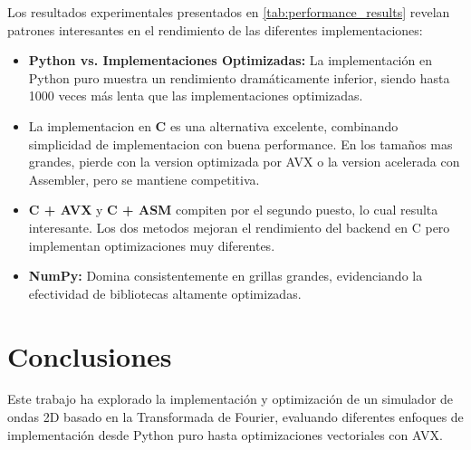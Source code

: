 \documentclass[a4paper]{article}
\begin{document}
Los resultados experimentales presentados en \ref{tab:performance_results} revelan patrones interesantes en el rendimiento de las diferentes implementaciones:
\begin{itemize}
    \item \textbf{Python vs. Implementaciones Optimizadas:} La implementación en Python puro muestra un rendimiento dramáticamente inferior, siendo hasta 1000 veces más lenta que las implementaciones optimizadas.

    \item La implementacion en \textbf{C} es una alternativa excelente, combinando simplicidad de implementacion con buena performance. En los tamaños mas grandes, pierde con
          la version optimizada por AVX o la version acelerada con Assembler, pero se mantiene competitiva.

    \item \textbf{C + AVX} y \textbf{C + ASM} compiten por el segundo puesto, lo cual resulta interesante. Los dos metodos mejoran el rendimiento del backend en C pero implementan
          optimizaciones muy diferentes.

    \item \textbf{NumPy:} Domina consistentemente en grillas grandes, evidenciando la efectividad de bibliotecas altamente optimizadas.
\end{itemize}

\section{Conclusiones}

Este trabajo ha explorado la implementación y optimización de un simulador de ondas 2D basado en la Transformada de Fourier, evaluando diferentes enfoques de implementación desde Python puro hasta optimizaciones vectoriales con AVX. 

\printbibliography
\end{document}
